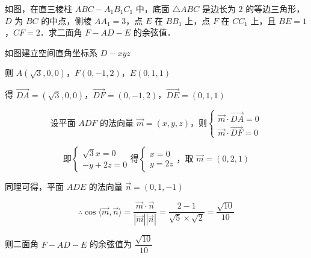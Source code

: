 \begin{example}[\bkstar{3}{5}]
如图，在直三棱柱 $ABC-A_1B_1C_1$ 中，底面 $\triangle ABC$ 是边长为 $2$ 的等边三角形，$D$ 为 $BC$ 的中点，侧棱 $AA_1=3$，点 $E$ 在 $BB_1$ 上，点 $F$ 在 $CC_1$ 上，且 $BE=1$，$CF=2$．求二面角 $F-AD-E$ 的余弦值．
\end{example}
\begin{solution}
如图建立空间直角坐标系 $D-xyz$

则 $A\left(\sqrt{3},0,0\right)$，$F(0,-1,2)$，$E(0,1,1)$

得 $\overrightarrow{DA}=\left(\sqrt{3},0,0\right)$，$\overrightarrow{DF}=(0,-1,2)$，$\overrightarrow{DE}=(0,1,1)$

$$
\text{设平面 }ADF\text{ 的法向量 }\overrightarrow{m}=(x,y,z)\text{，则}\left\{\begin{array}{l}
\overrightarrow{m}\cdot\overrightarrow{DA}=0\\
\overrightarrow{m}\cdot\overrightarrow{DF}=0
\end{array}\right.
$$

$$
\text{即}\left\{\begin{array}{l}
\sqrt{3}x=0\\
-y+2z=0
\end{array}\right.\text{得}\left\{\begin{array}{l}
x=0\\
y=2z
\end{array}\right.\text{，取 }\overrightarrow{m}=(0,2,1)
$$

同理可得，平面 $ADE$ 的法向量 $\overrightarrow{n}=(0,1,-1)$

$$
\therefore \cos\langle\overrightarrow{m},\overrightarrow{n}\rangle=\dfrac{\overrightarrow{m}\cdot\overrightarrow{n}}{\left|\overrightarrow{m}\right|\left|\overrightarrow{n}\right|}=\dfrac{2-1}{\sqrt{5}\times\sqrt{2}}=\dfrac{\sqrt{10}}{10}
$$

则二面角 $F-AD-E$ 的余弦值为 $\dfrac{\sqrt{10}}{10}$
\end{solution}

\vspace{2em}
